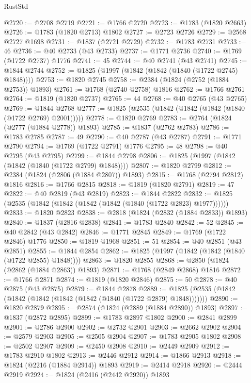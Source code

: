 \begin{lexlean}{RustStd}
\begin{coremodule}
@2720 := @2708 @2719
@2721 := @1766 @2720
@2723 := @1783 (@1820 @2663)
@2726 := @1783 (@1820 @2713) @1802
@2727 := @2723 @2726
@2729 := @2568 @2727 @1698
@2731 := @1837 (@2721 @2729)
@2732 := @1783 @2731
@2733 := 46
@2736 := @40 @2733 (@43 @2733)
@2737 := @1771 @2736
@2740 := @1769 (@1722 @2737) @1776
@2741 := 45
@2744 := @40 @2741 (@43 @2741)
@2745 := @1844 @2744
@2752 := @1825 (@1997 (@1842 (@1842 (@1840 (@1722 @2745) @1848))))
@2753 := @1820 @2745
@2758 := @2384 (@1824 (@2752 (@1884 @2753)) @1893)
@2761 := @1768 (@2740 @2758) @1816
@2762 := @1766 @2761
@2764 := @1819 (@1820 @2737)
@2765 := 44
@2768 := @40 @2765 (@43 @2765)
@2769 := @1844 @2768
@2777 := @1825 (@2535 (@1842 (@1842 (@1842 (@1840 (@1722 @2769) @2001)))))
@2778 := @1820 @2769
@2783 := @2764 (@1824 (@2777 (@1884 @2778)) @1893)
@2785 := @1837 (@2762 @2783)
@2786 := @1783 @2785
@2787 := 49
@2790 := @40 @2787 (@43 @2787)
@2791 := @1771 @2790
@2794 := @1769 (@1722 @2791) @1776
@2795 := 48
@2798 := @40 @2795 (@43 @2795)
@2799 := @1844 @2798
@2806 := @1825 (@1997 (@1842 (@1842 (@1840 (@1722 @2799) @1848))))
@2807 := @1820 @2799
@2812 := @2384 (@1824 (@2806 (@1884 @2807)) @1893)
@2815 := @1768 (@2794 @2812) @1816
@2816 := @1766 @2815
@2818 := @1819 (@1820 @2791)
@2819 := 47
@2822 := @40 @2819 (@43 @2819)
@2823 := @1844 @2822
@2832 := @1825 (@2535 (@1842 (@1842 (@1842 (@1842 (@1840 (@1722 @2823) @1977))))))
@2833 := @1820 @2823
@2838 := @2818 (@1824 (@2832 (@1884 @2833)) @1893)
@2840 := @1837 (@2816 @2838)
@2841 := @1783 @2840
@2842 := 52
@2845 := @40 @2842 (@43 @2842)
@2846 := @1771 @2845
@2849 := @1769 (@1722 @2846) @1776
@2850 := @1819 @1968
@2851 := 51
@2854 := @40 @2851 (@43 @2851)
@2855 := @1844 @2854
@2862 := @1825 (@1997 (@1842 (@1842 (@1840 (@1722 @2855) @1848))))
@2863 := @1820 @2855
@2868 := @2850 (@1824 (@2862 (@1884 @2863)) @1893)
@2871 := @1768 (@2849 @2868) @1816
@2872 := @1766 @2871
@2874 := @1819 (@1820 @2846)
@2875 := 50
@2878 := @40 @2875 (@43 @2875)
@2879 := @1844 @2878
@2889 := @1825 (@2535 (@1842 (@1842 (@1842 (@1842 (@1842 (@1840 (@1722 @2879) @1848)))))))
@2890 := @1820 @2879
@2895 := @2874 (@1824 (@2889 (@1884 @2890)) @1893)
@2897 := @1837 (@2872 @2895)
@2899 := @1783 @2897 @1802
@2900 := @2841 @2899
@2901 := @2786 @2900
@2902 := @2732 @2901
@2903 := @2662 @2902
@2904 := @2579 @2903
@2905 := @2505 @2904
@2907 := @1783 @2905 @1802
@2908 := @2502 @2907
@2909 := @2450 @2908
@2910 := @2449 @2909
@2912 := @1783 @2910 @1802
@2913 := @2446 @2912
@2914 := @1866 @2913
@2918 := @1824 (@2216 (@1884 @2914)) @1893
@2919 := @2414 @2918
@2920 := @2444 @2919
@2924 := @1824 (@2416 (@2442 @2920)) @1893

\end{coremodule}
\end{lexlean}
